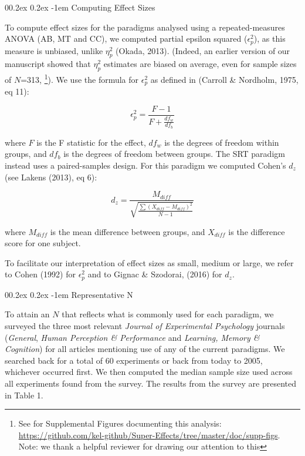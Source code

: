 \documentclass[
  man]{apa6}
\makeatletter
\let\oldparagraph\paragraph
\renewcommand{\paragraph}[1]{\oldparagraph{#1}\mbox{}}
\renewcommand{\paragraph}{\@startsection{paragraph}{4}{\parindent}%
  {0\baselineskip \@plus 0.2ex \@minus 0.2ex}%
  {-1em}%
  {\normalfont\normalsize\bfseries\itshape\typesectitle}}
\makeatother
\begin{document}
\hypertarget{computing-effect-sizes}{%
\paragraph{Computing Effect Sizes}\label{computing-effect-sizes}}

To compute effect sizes for the paradigms analysed using a repeated-measures ANOVA (AB, MT and CC), we computed partial epsilon squared (\(\epsilon_{p}^2\)), as this measure is unbiased, unlike \(\eta_{p}^2\) (Okada, 2013). (Indeed, an earlier version of our manuscript showed that \(\eta_{p}^2\) estimates are biased on average, even for sample
sizes of \(N\)=313, \footnote{See for Supplemental Figures documenting this analysis: \url{https://github.com/kel-github/Super-Effects/tree/master/doc/supp-figs}. Note: we thank a helpful reviewer for drawing our attention to this}). We use the formula for \(\epsilon_{p}^2\) as defined in (Carroll \& Nordholm, 1975, eq 11):

\begin{equation}
\epsilon_{p}^{2} = \frac{F-1}{F + \frac{df_w}{df_b}}
\end{equation}

where \(F\) is the F statistic for the effect, \(df_{w}\) is the degrees of freedom within groups, and \(df_{b}\) is the degrees of freedom between groups. The SRT paradigm instead uses a paired-samples design. For this paradigm we computed Cohen's \(d_{z}\) (see Lakens (2013), eq 6):

\begin{equation}
d_{z} = \frac{M_{diff}}{\sqrt{\frac{\sum(X_{diff} - M_{diff})^2}{N-1}}}
\end{equation}

where \(M_{diff}\) is the mean difference between groups, and \(X_{diff}\) is the difference score for one subject.

To facilitate our interpretation of effect sizes as small, medium or large, we refer to Cohen (1992) for \(\epsilon_{p}^2\) and to Gignac \& Szodorai, (2016) for \(d_z\).

\hypertarget{representative-n}{%
\paragraph{Representative N}\label{representative-n}}

To attain an \(N\) that reflects what is commonly used for each paradigm, we surveyed the three most relevant \emph{Journal of Experimental Psychology} journals (\emph{General}, \emph{Human Perception \& Performance} and \emph{Learning, Memory \& Cognition}) for all articles mentioning use of any of the current paradigms. We searched back for a total of 60 experiments or back from today to 2005, whichever occurred first. We then computed the median sample size used across all experiments found from the survey. The results from the survey are presented in Table 1.
\end{document}
